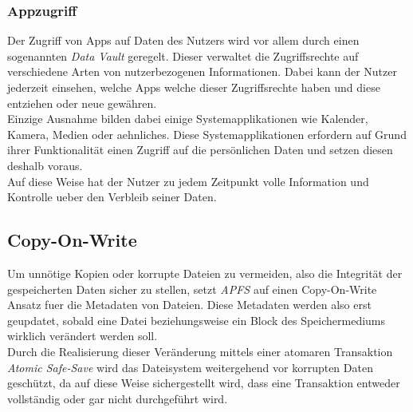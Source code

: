 \subsubsection{Appzugriff}
Der Zugriff von Apps auf Daten des Nutzers wird vor allem durch einen sogenannten \textit{Data Vault} geregelt\cite[S. 47]{Apple2020}. Dieser verwaltet die Zugriffsrechte auf verschiedene Arten von nutzerbezogenen Informationen. Dabei kann der Nutzer jederzeit einsehen, welche Apps welche dieser Zugriffsrechte haben und diese entziehen oder neue gewähren.\\
Einzige Ausnahme bilden dabei einige Systemapplikationen wie Kalender, Kamera, Medien oder aehnliches. Diese Systemapplikationen erfordern auf Grund ihrer Funktionalität einen Zugriff auf die persönlichen Daten und setzen diesen deshalb voraus.\\
Auf diese Weise hat der Nutzer zu jedem Zeitpunkt volle Information und Kontrolle ueber den Verbleib seiner Daten.

\subsection{Copy-On-Write}
Um unnötige Kopien oder korrupte Dateien zu vermeiden, also die Integrität der gespeicherten Daten sicher zu stellen, setzt \textit{APFS} auf einen Copy-On-Write Ansatz fuer die Metadaten von Dateien\cite{golem}. Diese Metadaten werden also erst geupdatet, sobald eine Datei beziehungsweise ein Block des Speichermediums wirklich verändert werden soll.\\
Durch die Realisierung dieser Veränderung mittels einer atomaren Transaktion \textit{Atomic Safe-Save} wird das Dateisystem weitergehend vor korrupten Daten geschützt, da auf diese Weise sichergestellt wird, dass eine Transaktion entweder vollständig oder gar nicht durchgeführt wird.


